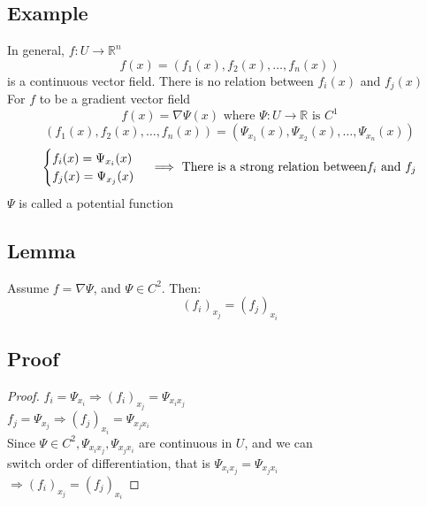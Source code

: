 \documentclass[12pt]{article}
\newcommand{\BR}{\mathbb R}
\begin{document}
\subsection*{Example}
    In general, $f:U\rightarrow\BR^n$ \\
    \[ f(x)=(f_1(x),f_2(x),\dots,f_n(x)) \]
    is a continuous vector field. There is no relation between $f_i(x)$ and $f_j(x)$ \\
    For $f$ to be a gradient vector field \\
    \[ f(x)=\nabla\Psi(x) \text{ where }\Psi:U\rightarrow\BR\text{ is }C^1 \]
    \[ (f_1(x),f_2(x),\dots,f_n(x))=(\Psi_{x_1}(x),\Psi_{x_2}(x),\dots,\Psi_{x_n}(x)) \]
    \begin{equation*}
        \begin{cases}
          f_i(x)=\Psi_{x_i}(x) \\
          f_j(x)=\Psi_{x_j}(x) \\
        \end{cases}\implies\newline\text{ There is a strong relation between}f_i\text{ and }f_j
    \end{equation*}
    $\Psi$ is called a potential function \\
\subsection*{Lemma}
  Assume $f=\nabla\Psi$, and $\Psi\in C^2$. Then: \\
  \[ (f_i)_{x_j}=(f_j)_{x_i} \]
\subsection*{Proof}
  \begin{proof}
    $f_i=\Psi_{x_i}\Rightarrow(f_i)_{x_j}=\Psi_{x_ix_j}$ \\
    $f_j=\Psi_{x_j}\Rightarrow(f_j)_{x_i}=\Psi_{x_jx_i}$ \\
    Since $\Psi\in C^2, \Psi_{x_ix_j},\Psi_{x_jx_i}$ are continuous in $U$, and we can \\
    switch order of differentiation, that is $\Psi_{x_ix_j}=\Psi_{x_jx_i}$ \\
    $\Rightarrow(f_i)_{x_j}=(f_j)_{x_i}$
  \end{proof}
\end{document}
